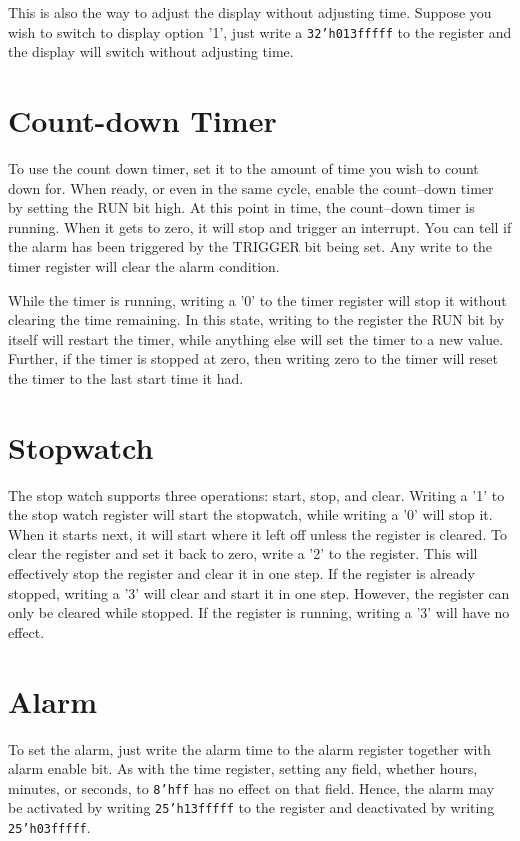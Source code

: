 \documentclass{gqtekspec}
\begin{document}
This is also the way to adjust the display without adjusting time.  Suppose
you wish to switch to display option '1', just write a {\tt 32'h013fffff} to
the register and the display will switch without adjusting time.

\section{Count-down Timer}
To use the count down timer, set it to the amount of time you wish to count
down for.  When ready, or even in the same cycle, enable the count--down
timer by setting the RUN bit high.  At this point in time, the count--down
timer is running.  When it gets to zero, it will stop and trigger an interrupt.
You can tell if the alarm has been triggered by the TRIGGER bit being set.
Any write to the timer register will clear the alarm condition.

While the timer is running, writing a '0' to the timer register will stop it
without clearing the time remaining.  In this state, writing to the register
the RUN bit by itself will restart the timer, while anything else will set the
timer to a new value.  Further, if the timer is stopped at zero, then writing
zero to the timer will reset the timer to the last start time it had.

\section{Stopwatch}
The stop watch supports three operations: start, stop, and clear.  Writing a
'1' to the stop watch register will start the stopwatch, while writing a '0'
will stop it.  When it starts next, it will start where it left off unless the
register is cleared.  To clear the register and set it back to zero, write a
'2' to the register.  This will effectively stop the register and clear it in
one step.  If the register is already stopped, writing a '3' will clear and
start it in one step.  However, the register can only be cleared while stopped.
If the register is running, writing a '3' will have no effect.

\section{Alarm}
To set the alarm, just write the alarm time to the alarm register together
with alarm enable bit.  As with the time register, setting any field,
whether hours, minutes, or seconds, to {\tt 8'hff} has no effect on that
field.  Hence, the alarm may be activated by writing {\tt 25'h13fffff} to
the register and deactivated by writing {\tt 25'h03fffff}.
\end{document}
